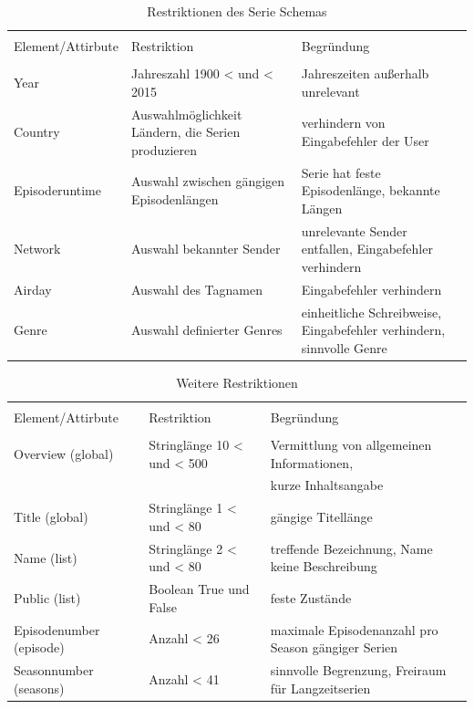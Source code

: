 \documentclass[a4paper]{article}
\begin{document}
\begin{table}[H]
\caption{Restriktionen des Serie Schemas}


\begin{tabular}{l l l}
\\ [-0.5ex]

\hline\hline
\\ [-0.5ex]
Element/Attirbute & Restriktion & Begründung
\\ [1.5ex]
\hline
\\ [-0.5ex]
Year & Jahreszahl 1900 < und < 2015 & Jahreszeiten außerhalb unrelevant \\[1ex]
Country & Auswahlmöglichkeit Ländern, die Serien produzieren & verhindern von Eingabefehler der User\\[1ex]
Episoderuntime & Auswahl zwischen gängigen Episodenlängen& Serie hat feste Episodenlänge, bekannte Längen \\[1ex]
Network & Auswahl bekannter Sender & unrelevante Sender entfallen, Eingabefehler verhindern \\[1ex]
Airday & Auswahl des Tagnamen & Eingabefehler verhindern \\[1ex]
Genre & Auswahl definierter Genres & einheitliche Schreibweise, Eingabefehler verhindern, sinnvolle Genre\\[1ex]

\hline
\end{tabular}
\label{tab:restriktionenderxsd}
\end{table}




\begin{table}[H]
\caption{Weitere Restriktionen}


\begin{tabular}{l l l}
\\ [-0.5ex]

\hline\hline
\\ [-0.5ex]
Element/Attirbute & Restriktion & Begründung
\\ [1.5ex]
\hline
\\ [-0.5ex]
Overview (global) & Stringlänge 10 < und < 500 & Vermittlung von allgemeinen Informationen,\\[1ex]
 &&kurze Inhaltsangabe \\[1ex]
Title (global) & Stringlänge 1 < und < 80 & gängige Titellänge \\[1ex]
Name (list) & Stringlänge 2 < und < 80 & treffende Bezeichnung, Name keine Beschreibung \\[1ex] 
Public (list) & Boolean True und False & feste Zustände \\[1ex] 
Episodenumber (episode) & Anzahl < 26 & maximale Episodenanzahl pro Season gängiger Serien \\[1ex] 
Seasonnumber (seasons) & Anzahl < 41 & sinnvolle Begrenzung, Freiraum für Langzeitserien \\[1ex] 

\hline
\end{tabular}
\label{tab:restriktionenderxsd}
\end{table}
\end{document}
